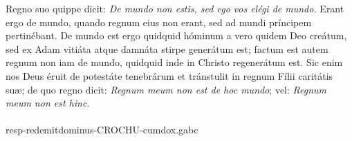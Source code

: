 \documentclass[options]{article}
\begin{document}
	Regno suo quippe dicit: \emph{De mundo non estis, sed ego vos elégi de mundo.} Erant ergo de mundo, quando regnum eius non erant, sed ad mundi príncipem pertinébant. De mundo est ergo quidquid hóminum a vero quidem Deo creátum, sed ex Adam vitiáta atque damnáta stirpe generátum est; factum est autem regnum non iam de mundo, quidquid inde in Christo regenerátum est. Sic enim nos Deus éruit de potestáte tenebrárum et tránstulit in regnum Fílii caritátis suæ; de quo regno dicit: \emph{Regnum meum non est de hoc mundo}; vel: \emph{Regnum meum non est hinc.}\\
	\\
	  resp-redemitdominus-CROCHU-cumdox.gabc
	
\end{document}
